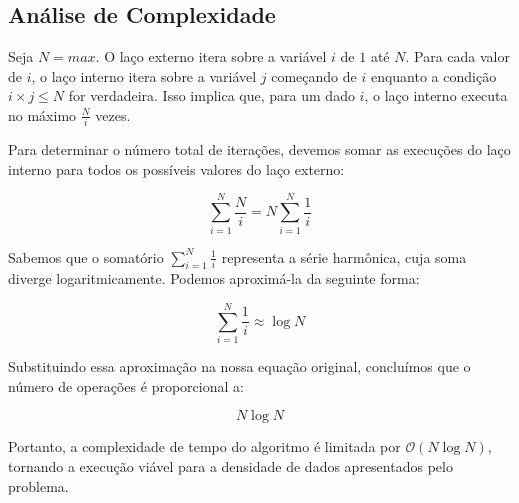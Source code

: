 \documentclass[12pt,a4paper]{article}
\begin{document}
\subsection{Análise de Complexidade}

Seja $N = max$. O laço externo itera sobre a variável $i$ de $1$ até $N$. Para cada valor de $i$, o laço interno itera sobre a variável $j$ começando de $i$ enquanto a condição $i \times j \le N$ for verdadeira. Isso implica que, para um dado $i$, o laço interno executa no máximo $\frac{N}{i}$ vezes.

Para determinar o número total de iterações, devemos somar as execuções do laço interno para todos os possíveis valores do laço externo:

$$ \sum_{i=1}^{N} \frac{N}{i} = N \sum_{i=1}^{N} \frac{1}{i} $$

Sabemos que o somatório $\sum_{i=1}^{N} \frac{1}{i}$ representa a série harmônica, cuja soma diverge logaritmicamente. Podemos aproximá-la da seguinte forma:

$$ \sum_{i=1}^{N} \frac{1}{i} \approx \log N $$

Substituindo essa aproximação na nossa equação original, concluímos que o número de operações é proporcional a:

$$ N \log N $$

Portanto, a complexidade de tempo do algoritmo é limitada por $\mathcal{O}(N \log N)$, tornando a execução viável para a densidade de dados apresentados pelo problema.
\end{document}
